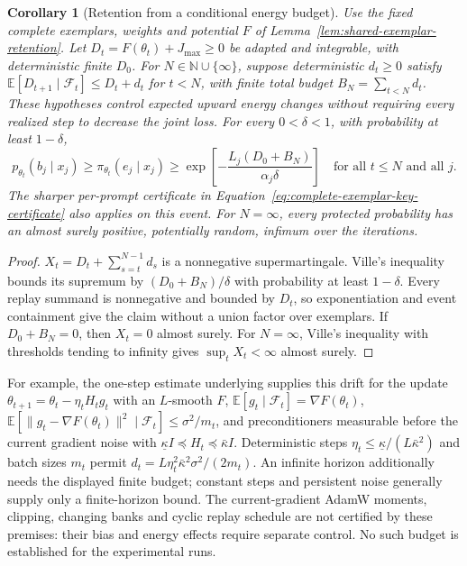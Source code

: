\documentclass{article}
\newcommand{\enforcehalffinalproseline}{%
  \setlength{\parfillskip}{0pt plus .20\linewidth}}
\newcommand{\1}{\mathbf 1}
\newcommand{\E}{\mathbb E}
\newtheorem{corollary}[lemma]{Corollary}
\theoremstyle{remark}
\theoremstyle{definition}
\theoremstyle{plain}
\begin{document}
\begin{corollary}[Retention from a conditional energy budget]
\enforcehalffinalproseline
\label{cor:replay-stochastic-energy-budget}
Use the fixed complete exemplars, weights and potential $F$ of
Lemma~\ref{lem:shared-exemplar-retention}. Let
$D_t=F(\theta_t)+J_{\max}\ge0$ be adapted and integrable, with deterministic
finite $D_0$. For $N\in\mathbb N\cup\{\infty\}$, suppose deterministic
$d_t\ge0$ satisfy $\E[D_{t+1}\mid\mathcal F_t]\le D_t+d_t$ for $t<N$,
with finite total budget $B_N=\sum_{t<N}d_t$.
These hypotheses control expected upward energy changes without requiring
every realized step to decrease the joint loss.
For every $0<\delta<1$, with probability at least $1-\delta$,
\begin{equation}
 p_{\theta_t}(b_j\mid x_j)\ge\pi_{\theta_t}(e_j\mid x_j)
 \ge\exp\!\left[-\frac{L_j(D_0+B_N)}{\alpha_j\delta}\right]
 \quad\text{for all }t\le N\text{ and all }j.
 \label{eq:replay-stochastic-energy-budget}
\end{equation}
The sharper per-prompt certificate in
Equation~\eqref{eq:complete-exemplar-key-certificate} also applies on this
event. For $N=\infty$, every protected probability has an almost surely
positive, potentially random, infimum over the iterations.
\end{corollary}
\begin{proof}
\enforcehalffinalproseline
$X_t=D_t+\sum_{s=t}^{N-1}d_s$ is a nonnegative supermartingale. Ville's
inequality bounds its supremum by $(D_0+B_N)/\delta$ with probability at
least $1-\delta$. Every replay summand is nonnegative and bounded by $D_t$,
so exponentiation and event containment give the claim without a union
factor over exemplars. If $D_0+B_N=0$, then $X_t=0$ almost surely.
For $N=\infty$, Ville's inequality with thresholds tending to infinity gives
$\sup_tX_t<\infty$ almost surely.
\end{proof}

For example, the one-step estimate underlying
\citet[Lemma~2.1, Eq.~(2.13)]{wang2017sqn} supplies this drift for the update
$\theta_{t+1}=\theta_t-\eta_tH_tg_t$ with an $L$-smooth $F$,
$\E[g_t\mid\mathcal F_t]=\nabla F(\theta_t)$,
$\E[\|g_t-\nabla F(\theta_t)\|^2\mid\mathcal F_t]\le\sigma^2/m_t$,
and preconditioners measurable before the current gradient noise with
$\underline\kappa I\preceq H_t\preceq\bar\kappa I$.
Deterministic steps $\eta_t\le\underline\kappa/(L\bar\kappa^2)$ and
batch sizes $m_t$ permit
$d_t=L\eta_t^2\bar\kappa^2\sigma^2/(2m_t)$.
An infinite horizon additionally needs the displayed finite budget;
constant steps and persistent noise generally supply only a finite-horizon
bound. The current-gradient AdamW moments, clipping, changing banks and
cyclic replay schedule are not certified by these premises: their bias and
energy effects require separate control. No such budget is established for
the experimental runs.
\end{document}
